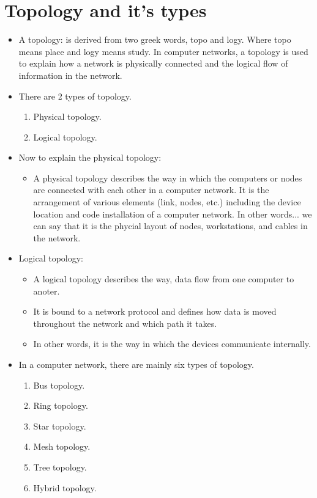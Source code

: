 \section{Topology and it's types}
\begin{itemize}
    \item A topology: is derived from two greek words, topo and logy. Where topo means place and logy means study. In computer networks, a topology is used to explain how a network is physically connected and the logical flow of information in the network.
    \item There are 2 types of topology.
        \begin{enumerate}
            \item Physical topology.
            \item Logical topology.
        \end{enumerate}
    
    \item Now to explain the physical topology:
        \begin{itemize}
            \item A physical topology describes the way in which the computers or nodes are connected with each other in a computer network. It is the arrangement of various elements (link, nodes, etc.) including the device location and code installation of a computer network. In other words... we can say that it is the phycial layout of nodes, workstations, and cables in the network.
        \end{itemize}
    
    \item Logical topology:
        \begin{itemize}
            \item A logical topology describes the way, data flow from one computer to anoter. 
            \item It is bound to a network protocol and defines how data is moved throughout the network and which path it takes. 
            \item In other words, it is the way in which the devices communicate internally.
        \end{itemize}
    
    \item In a computer network, there are mainly six types of topology.
        \begin{enumerate}
            \item Bus topology.
            \item Ring topology.
            \item Star topology.
            \item Mesh topology.
            \item Tree topology.
            \item Hybrid topology.
        \end{enumerate}
    

\end{itemize}
